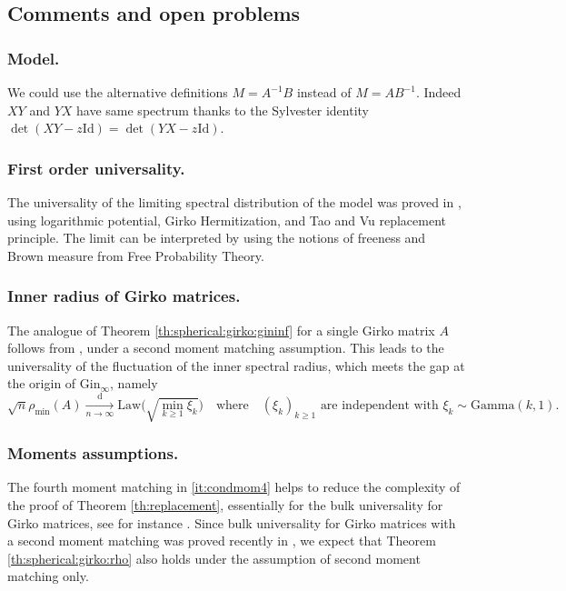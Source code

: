 \documentclass[10pt,reqno]{amsart}
\newcommand{\dd}{\mathrm{d}}
\newcommand{\<}{\langle}
\renewcommand{\>}{\rangle}
\numberwithin{equation}{section}
\begin{document}
\subsection{Comments and open problems}

\subsubsection{Model.} 
We could use the alternative definitions $M=A^{-1}B$ instead of $M=AB^{-1}$. Indeed $XY$ and $YX$ have same spectrum thanks to the Sylvester identity $\det(XY-z\mathrm{Id})=\det(YX-z\mathrm{Id})$. 

\subsubsection{First order universality.}
The universality of the limiting spectral distribution of the model was proved in \cite{MR2772389}, using logarithmic potential, Girko Hermitization, and Tao and Vu replacement principle. The limit can be interpreted by using the notions of freeness and Brown measure from Free Probability Theory.

\subsubsection{Inner radius of Girko matrices.}
The analogue of Theorem \ref{th:spherical:girko:gininf} for a single Girko matrix $A$ follows from \cite[Th.~2.1~and~2.2]{maltsev-osman}, under a second moment matching assumption. This leads to the universality of the fluctuation of the inner spectral radius, which meets the gap at the origin of $\mathrm{Gin}_\infty$, namely
\begin{equation}
    \sqrt{n}\rho_{\min}(A)
    \xrightarrow[n\to\infty]{\dd}
    \mathrm{Law}\Bigr(\sqrt{\min_{k\geq1}\xi_k}\Bigr)
    \quad\text{where}\quad
    \text{${(\xi_k)}_{k\geq1}$ are independent with $\xi_k\sim\mathrm{Gamma}(k,1)$.}
\end{equation}

\subsubsection{Moments assumptions.} The fourth moment matching in \ref{it:condmom4} helps to reduce the complexity of the proof of Theorem \ref{th:replacement}, essentially for  the bulk universality for Girko matrices, see for instance \cite{MR3306005}. Since bulk universality for Girko matrices with a second moment matching was proved recently in \cite{maltsev-osman}, we expect that Theorem \ref{th:spherical:girko:rho} also holds 
under the assumption of second moment matching only. 
\end{document}
